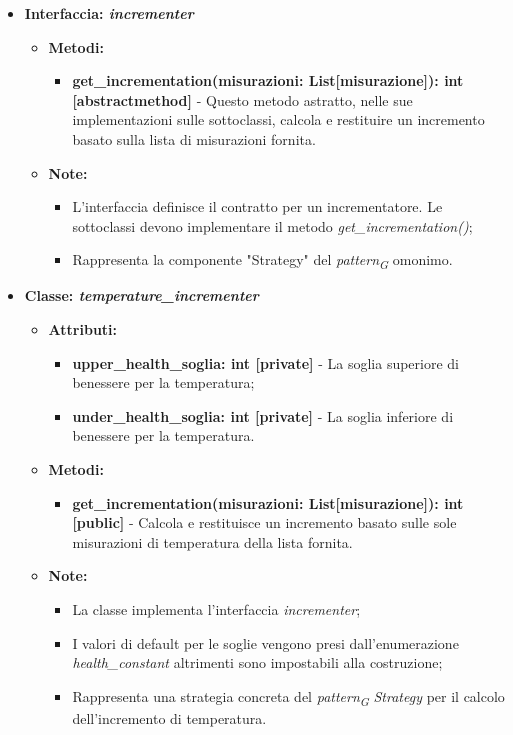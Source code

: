 \begin{itemize}
    \item \textbf{Interfaccia: \textit{incrementer}}
    \begin{itemize}
        \item \textbf{Metodi:}
        \begin{itemize}
            \item \textbf{get\_incrementation(misurazioni: List[misurazione]): int [abstractmethod]} - Questo metodo astratto, nelle sue implementazioni sulle sottoclassi, calcola e restituire un incremento basato sulla lista di misurazioni fornita.
        \end{itemize}
        \item\textbf{Note:}
        \begin{itemize}
            \item L'interfaccia definisce il contratto per un incrementatore. Le sottoclassi devono implementare il metodo \textit{get\_incrementation()};
            \item Rappresenta la componente "Strategy" del \textit{pattern}\textsubscript{\textit{G}} omonimo.
        \end{itemize}
    \end{itemize}

    \item \textbf{Classe: \textit{temperature\_incrementer}}
    \begin{itemize}
        \item \textbf{Attributi:}
        \begin{itemize}
            \item \textbf{upper\_health\_soglia: int [private]} - La soglia superiore di benessere per la temperatura;
            \item \textbf{under\_health\_soglia: int [private]} - La soglia inferiore di benessere per la temperatura.
        \end{itemize}
        \item \textbf{Metodi:}
        \begin{itemize}
            \item \textbf{get\_incrementation(misurazioni: List[misurazione]): int [public]} - Calcola e restituisce un incremento basato sulle sole misurazioni di temperatura della lista fornita.
        \end{itemize}
        \item\textbf{Note:}
            \begin{itemize}
                \item La classe implementa l'interfaccia \textit{incrementer};
                \item I valori di default per le soglie vengono presi dall'enumerazione \textit{health\_constant} altrimenti sono impostabili alla costruzione;
                \item Rappresenta una strategia concreta del \textit{pattern}\textsubscript{\textit{G}} \textit{Strategy} per il calcolo dell'incremento di temperatura.
            \end{itemize}
        \end{itemize}


\end{itemize}
